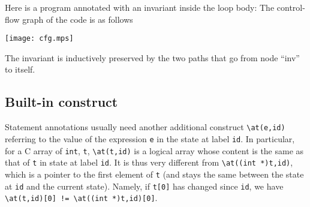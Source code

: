 \begin{example}
Here is a program annotated with an invariant inside the loop body:
The control-flow graph of the code is as follows
\begin{center}
\texttt{[image: cfg.mps]}
\end{center}
The invariant is inductively preserved by the two paths that go from
node ``inv'' to itself.
\end{example}

\begin{example}

\end{example}


\subsection{Built-in construct \texorpdfstring{\at}{\textbackslash{}at}}
\label{sec:at}
 Statement annotations usually need another additional
construct \lstinline|\at(e,id)| referring to the value of the
expression \lstinline|e| in the state at label \lstinline|id|.
In particular, for a C array of \lstinline|int|,
\lstinline|t|, \lstinline|\at(t,id)| is a logical
array whose content is the same as that of \lstinline|t| in state at label
\lstinline|id|. It is thus very different from
\lstinline|\at((int *)t,id)|, which
is a pointer to the first element of \lstinline|t| (and stays the same between
the state at \lstinline|id| and the current state). Namely, if
\lstinline|t[0]| has changed since \lstinline|id|, we have
\lstinline|\at(t,id)[0] != \at((int *)t,id)[0]|.


